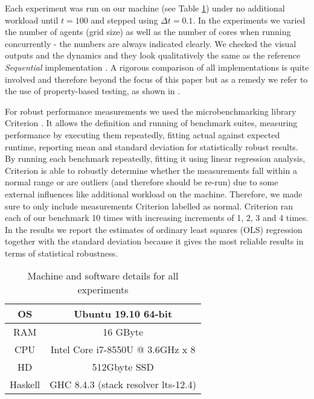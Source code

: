 Each experiment was run on our machine (see Table \ref{tab:machine_specs}) under no additional workload until $t = 100$ and stepped using $\Delta t = 0.1$. In the experiments we varied the number of agents (grid size) as well as the number of cores when running concurrently - the numbers are always indicated clearly. We checked the visual outputs and the dynamics and they look qualitatively the same as the reference \textit{Sequential} implementation \cite{thaler_pure_2018}. A rigorous comparison of all implementations is quite involved and therefore beyond the focus of this paper but as a remedy we refer to the use of property-based testing, as shown in \cite{thaler_show_2019}.

For robust performance measurements we used the microbenchmarking library Criterion \cite{criterion_serpentine, criterion_hackage}. It allows the definition and running of benchmark suites, measuring performance by executing them repeatedly, fitting actual against expected runtime, reporting mean and standard deviation for statistically robust results. By running each benchmark repeatedly, fitting it using linear regression analysis, Criterion is able to robustly determine whether the measurements fall within a normal range or are outliers (and therefore should be re-run) due to some external influences like additional workload on the machine. Therefore, we made sure to only include measurements Criterion labelled as normal. Criterion ran each of our benchmark 10 times with increasing increments of 1, 2, 3 and 4 times. In the results we report the estimates of ordinary least squares (OLS) regression together with the standard deviation because it gives the most reliable results in terms of statistical robustness.


\begin{table}
	\centering
	\begin{tabular}{ c || c }
		OS & Ubuntu 19.10 64-bit \\ \hline
		RAM & 16 GByte \\ \hline
		CPU & Intel Core i7-8550U @ 3.6GHz x 8 \\ \hline
		HD & 512Gbyte SSD \\ \hline
		Haskell & GHC 8.4.3 (stack resolver lts-12.4)
	\end{tabular}
	
	\caption{Machine and software details for all experiments}
	\label{tab:machine_specs}
\end{table}

